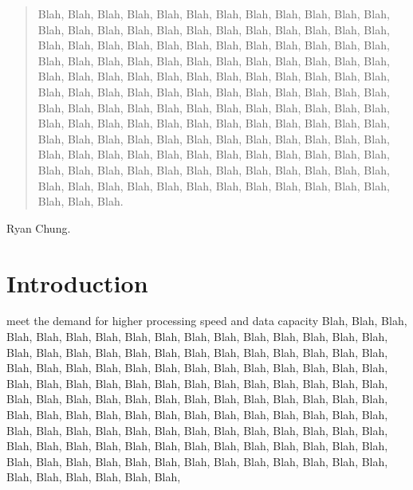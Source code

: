 \documentclass[lettersize,journal]{IEEEtran}
\begin{document}
\begin{abstract}

    Blah, Blah, Blah, Blah, Blah, Blah, Blah, Blah, Blah, Blah, Blah, Blah, Blah, Blah, Blah, Blah, Blah, Blah, Blah, Blah, Blah, 
    Blah, Blah, Blah, Blah, Blah, Blah, Blah, Blah, Blah, Blah, Blah, Blah, Blah, Blah, Blah, Blah, Blah, Blah, Blah, Blah, Blah, 
    Blah, Blah, Blah, Blah, Blah, Blah, Blah, Blah, Blah, Blah, Blah, Blah, Blah, Blah, Blah, Blah, Blah, Blah, Blah, Blah, Blah, 
    Blah, Blah, Blah, Blah, Blah, Blah, Blah, Blah, Blah, Blah, Blah, Blah, Blah, Blah, Blah, Blah, Blah, Blah, Blah, Blah, Blah, 
    Blah, Blah, Blah, Blah, Blah, Blah, Blah, Blah, Blah, Blah, Blah, Blah, Blah, Blah, Blah, Blah, Blah, Blah, Blah, Blah, Blah, 
    Blah, Blah, Blah, Blah, Blah, Blah, Blah, Blah, Blah, Blah, Blah, Blah, Blah, Blah, Blah, Blah, Blah, Blah, Blah, Blah, Blah, 
    Blah, Blah, Blah, Blah, Blah, Blah, Blah, Blah, Blah, Blah, Blah, Blah, Blah, Blah, Blah, Blah, Blah, Blah, Blah, Blah, Blah.
\end{abstract}

\begin{IEEEkeywords}
    Ryan Chung.
\end{IEEEkeywords}


\section{Introduction}
	 meet the demand for higher processing speed and data capacity 
    Blah, Blah, Blah, Blah, Blah, Blah, Blah, Blah, Blah, Blah, Blah, Blah, Blah, Blah, Blah, Blah, Blah, Blah, 
    Blah, Blah, Blah, Blah, Blah, Blah, Blah, Blah, Blah, Blah, Blah, Blah, Blah, Blah, Blah, Blah, Blah, Blah, 
    Blah, Blah, Blah, Blah, Blah, Blah, Blah, Blah, Blah, Blah, Blah, Blah, Blah, Blah, Blah, Blah, Blah, Blah, 
    Blah, Blah, Blah, Blah, Blah, Blah, Blah, Blah, Blah, Blah, Blah, Blah, Blah, Blah, Blah, Blah, Blah, Blah, 
    Blah, Blah, Blah, Blah, Blah, Blah, Blah, Blah, Blah, Blah, Blah, Blah, Blah, Blah, Blah, Blah, Blah, Blah, 
    Blah, Blah, Blah, Blah, Blah, Blah, Blah, Blah, Blah, Blah, Blah, Blah, Blah, Blah, Blah, Blah, Blah, Blah, 
    Blah, Blah, Blah, Blah, Blah, Blah, Blah, Blah, Blah, Blah, Blah, Blah, Blah, Blah, Blah, Blah, Blah, Blah, 
    
\end{document}
